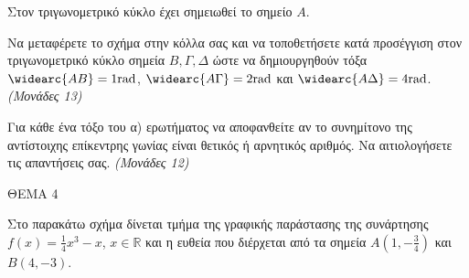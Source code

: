 \documentclass[11pt,a4paper,twoside]{book}
\newcommand{\monades}[1]{\hfill \textit{(Μονάδες #1)}}
\begin{document}
\begin{center}
\end{center}

Στον τριγωνομετρικό κύκλο έχει σημειωθεί το σημείο $A$.

\begin{alist}
\item Να μεταφέρετε το σχήμα στην κόλλα σας και να τοποθετήσετε κατά προσέγγιση στον τριγωνομετρικό κύκλο σημεία $B, \Gamma, \Delta$ ώστε να δημιουργηθούν τόξα $\widearc{AB} = 1\text{rad}$, $\widearc{A\Gamma} = 2\text{rad}$ και $\widearc{A\Delta} = 4\text{rad}$. \monades{13}
\item Για κάθε ένα τόξο του α) ερωτήματος να αποφανθείτε αν το συνημίτονο της αντίστοιχης επίκεντρης γωνίας είναι θετικός ή αρνητικός αριθμός. Να αιτιολογήσετε τις απαντήσεις σας. \monades{12}
\end{alist}

\vspace{4mm}

ΘΕΜΑ 4

Στο παρακάτω σχήμα δίνεται τμήμα της γραφικής παράστασης της συνάρτησης $f(x) = \frac{1}{4}x^3 - x$, $x \in \mathbb{R}$ και η ευθεία που διέρχεται από τα σημεία $A\left(1, -\frac{3}{4}\right)$ και $B(4, -3)$.
\end{document}
